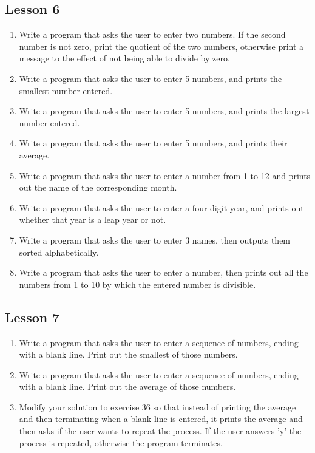 \subsection{Lesson 6}

\begin{enumerate}
	\item Write a program that asks the user to enter two numbers. If the    second number is not zero, print the quotient of the two numbers,    otherwise print a message to the effect of not being able to divide    by zero.
	\item Write a program that asks the user to enter 5 numbers, and    prints the smallest number entered.
	\item Write a program that asks the user to enter 5 numbers, and    prints the largest number entered.
	\item Write a program that asks the user to enter 5 numbers, and    prints their average.
	\item Write a program that asks the user to enter a number from 1 to    12 and prints out the name of the corresponding month.
	\item Write a program that asks the user to enter a four digit year,    and prints out whether that year is a leap year or not.
	\item Write a program that asks the user to enter 3 names, then    outputs them sorted alphabetically.
	\item Write a program that asks the user to enter a number, then    prints out all the numbers from 1 to 10 by which the entered number    is divisible.
\end{enumerate}

\subsection{Lesson 7}

\begin{enumerate}
	\item Write a program that asks the user to enter a sequence of    numbers, ending with a blank line. Print out the smallest of those    numbers.
	\item Write a program that asks the user to enter a sequence of    numbers, ending with a blank line. Print out the average of those    numbers.
	\item Modify your solution to exercise 36 so that instead of printing    the average and then terminating when a blank line is entered, it    prints the average and then asks if the user wants to repeat the    process. If the user answers 'y' the process is repeated, otherwise    the program terminates.
\end{enumerate}

